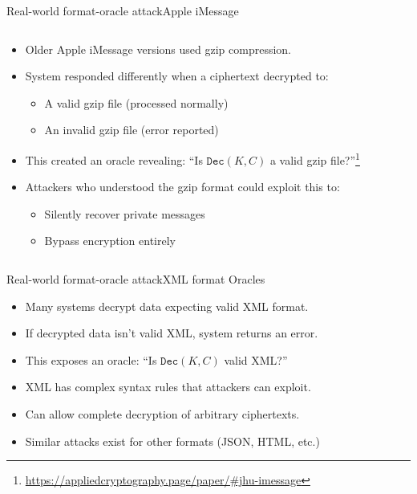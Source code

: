 \documentclass[aspectratio=169, lualatex, handout]{beamer}
\begin{document}
\begin{frame}{Real-world format-oracle attack}{Apple iMessage}
	\begin{columns}[c]
		\begin{column}{1\textwidth}
			\begin{itemize}
				\item Older Apple iMessage versions used gzip compression.
				\item System responded differently when a ciphertext decrypted to:
				      \begin{itemize}
					      \item A valid gzip file (processed normally)
					      \item An invalid gzip file (error reported)
				      \end{itemize}
				\item This created an oracle revealing: ``Is $\texttt{Dec}(K, C)$ a valid gzip file?''\footnote{\url{https://appliedcryptography.page/paper/\#jhu-imessage}}
				\item Attackers who understood the gzip format could exploit this to:
				      \begin{itemize}
					      \item Silently recover private messages
					      \item Bypass encryption entirely
				      \end{itemize}
			\end{itemize}
		\end{column}
	\end{columns}
\end{frame}

\begin{frame}{Real-world format-oracle attack}{XML format Oracles}
	\begin{itemize}
		\item Many systems decrypt data expecting valid XML format.
		\item If decrypted data isn't valid XML, system returns an error.
		\item This exposes an oracle: ``Is $\texttt{Dec}(K, C)$ valid XML?''
		\item XML has complex syntax rules that attackers can exploit.
		\item Can allow complete decryption of arbitrary ciphertexts.
		\item Similar attacks exist for other formats (JSON, HTML, etc.)
	\end{itemize}
\end{frame}
\end{document}
